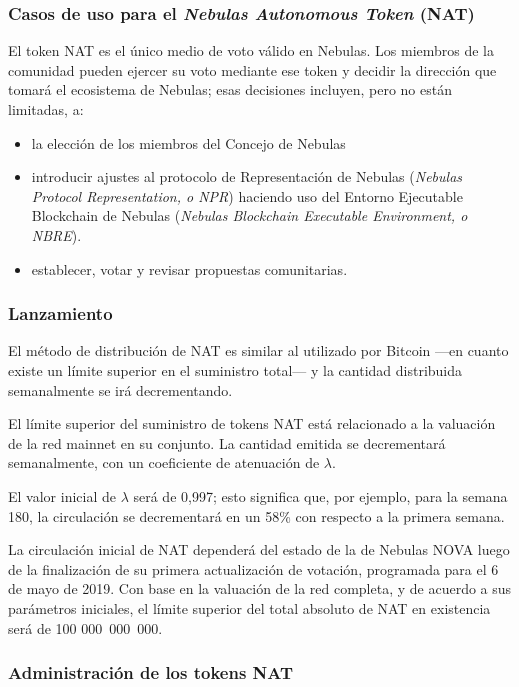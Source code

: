 \subsubsection{Casos de uso para el \textit{Nebulas Autonomous Token} (NAT)}

El token NAT es el único medio de voto válido en Nebulas. Los miembros de la comunidad pueden ejercer su voto \onchain mediante ese token y decidir la dirección que tomará el ecosistema de Nebulas; esas decisiones incluyen, pero no están limitadas, a:

\begin{itemize}
	\item la elección de los miembros del Concejo de Nebulas
	\item introducir ajustes al protocolo de Representación de Nebulas (\textit{Nebulas Protocol Representation, o NPR}) haciendo uso del Entorno Ejecutable Blockchain de Nebulas (\textit{Nebulas Blockchain Executable Environment, o NBRE}).
	\item establecer, votar y revisar propuestas comunitarias.
\end{itemize}

\subsubsection{Lanzamiento}

El método de distribución de NAT es similar al utilizado por Bitcoin —en cuanto existe un límite superior en el suministro total— y la cantidad distribuida semanalmente se irá decrementando.

El límite superior del suministro de tokens NAT está relacionado a la valuación \nr de la red mainnet en su conjunto. La cantidad emitida se decrementará semanalmente, con un coeficiente de atenuación de $\lambda$.

El valor inicial de $\lambda$ será de 0,997; esto significa que, por ejemplo, para la semana 180, la circulación se decrementará en un 58\% con respecto a la primera semana.

La circulación inicial de NAT dependerá del estado de la \mainnet de Nebulas NOVA luego de la finalización de su primera actualización de votación, programada para el 6 de mayo de 2019. Con base en la valuación \nr de la red completa, y de acuerdo a sus parámetros iniciales, el límite superior del total absoluto de NAT en existencia será de 100 000 000 000.

\subsubsection{Administración de los tokens NAT}

